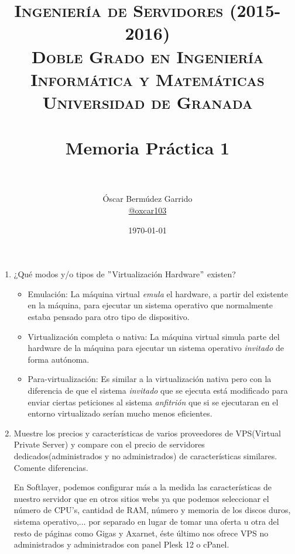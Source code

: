 \documentclass[paper=a4, fontsize=11pt]{scrartcl} %
\title{	
\normalfont \normalsize 
\textsc{{\bf Ingeniería de Servidores (2015-2016)} \\ Doble Grado en Ingeniería Informática y Matemáticas \\ Universidad de Granada} \\ [25pt] %
\horrule{0.5pt} \\[0.4cm] %
\huge Memoria Práctica 1 \\ %
\horrule{2pt} \\[0.5cm] %
}
\author{Óscar Bermúdez Garrido\\ \href{http://www.github.com/oxcar103}{@oxcar103}} %
\date{\normalsize\today} %
\numberwithin{equation}{section} %
\numberwithin{figure}{section} %
\numberwithin{table}{section} %
\begin{document}
\maketitle %

\newpage %

\tableofcontents %

\listoffigures

\listoftables

\newpage


\begin{enumerate}
	\section{Introducción}
	\subsection{Concepto de Máquina Virtual y virtualización}
		\item ¿Qué modos y/o tipos de $"$Virtualización Hardware$"$ existen?
		\begin{itemize}
			\item Emulación: La máquina virtual \textit{emula} el hardware, a partir del existente
			en la máquina, para ejecutar un sistema operativo que normalmente estaba pensado para
			otro tipo de dispositivo.
			
			\item Virtualización completa o nativa: La máquina virtual simula parte del hardware de
			la máquina para ejecutar un sistema operativo \textit{invitado} de forma autónoma.
			
			\item Para-virtualización: Es similar a la virtualización nativa pero con la diferencia
			de que el sistema \textit{invitado} que se ejecuta está modificado para enviar ciertas
			peticiones al sistema \textit{anfitrión} que si se ejecutaran en el entorno virtualizado
			serían mucho menos eficientes.
		\end{itemize}
		\cite{Virt}
		
		\item Muestre los precios y características de varios proveedores de VPS(Virtual Private
		Server) y compare con el precio de servidores dedicados(administrados y no administrados)
		de características similares. Comente diferencias.
		
		En Softlayer\cite{VPS_IBM}, podemos configurar más a la medida las características de
		nuestro servidor que en otros sitios webs ya que podemos seleccionar el número de CPU's,
		cantidad de RAM, número y memoria de los discos duros, sistema operativo,... por separado
		en lugar de tomar una oferta u otra del resto de páginas como Gigas\cite{VPS_Gigas} y
		Axarnet, éste último nos ofrece VPS no administrados\cite{VPS_Axarnet} y administrados con
		panel Plesk 12\cite{VPS_Axarnet_admin} o cPanel\cite{VPS_Axarnet_admin_2}.
		

\end{enumerate}
\end{document}
